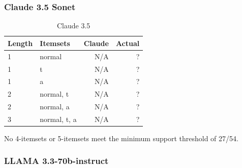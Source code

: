 \documentclass[12pt]{article}
\begin{document}
\newpage

\subsubsection{Claude 3.5 Sonet}
\begin{table}[h]
    \centering
    \begin{tabular}{|l|l|r|r|}
    \hline
        Length & Itemsets & Claude & Actual\\
            \hline
        1 & normal & N/A & ?\\
        \hline
        1 & t & N/A & ?\\
        \hline
        1 & a & N/A  & ?\\
        \hline
        2 &  normal, t & N/A & ?\\
        \hline
        2 &  normal, a  & N/A  & ?\\
        \hline
        3 & normal, t, a   &  N/A & ?\\
        \hline
    \end{tabular}
    \caption{Claude 3.5}
    \label{tab:my_label}
\end{table}

No 4-itemsets or 5-itemsets meet the minimum support threshold of 27/54.

\newpage
\subsubsection{LLAMA 3.3-70b-instruct}
\end{document}

